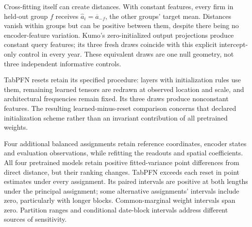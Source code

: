 \documentclass[11pt]{article}
\begin{document}
Cross-fitting itself can create distances. With constant features, every firm
in held-out group $f$ receives $\widehat a_i=\overline a_{-f}$, the
other groups'
target mean. Distances vanish within groups but can be positive between them,
despite there being no encoder-feature variation. Kumo's zero-initialized output
projections produce constant query features; its three fresh draws coincide
with this explicit intercept-only control in every year. These equivalent draws
are one null geometry, not three independent informative controls.

TabPFN resets retain its specified procedure: layers with initialization rules
use them, remaining learned tensors are redrawn at observed location and scale,
and architectural frequencies remain fixed. Its three draws produce nonconstant
features. The resulting learned-minus-reset comparison concerns that declared
initialization scheme rather than an invariant contribution of all pretrained
weights.

\begin{table}[htbp]
  \centering\footnotesize\setlength{\tabcolsep}{4pt}
  
  \caption{Calibrated learned-minus-control forecasts. TabPFN uses
    three specified
    resets; Kumo's three fresh draws reproduce one intercept-only null,
    displayed once. Entries give
    paired joint log-score differences and conditional 95\% intervals at both
  block lengths, under both variance treatments.}
\end{table}
\begin{table}[htbp]
  \centering\small
  
  \caption{Sensitivity to five fixed fold assignments. Ranges summarize
    calibrated-minus-native-direct forecast differences and exposure $R^2$.
  They describe partition sensitivity rather than confidence intervals.}
\end{table}

Four additional balanced assignments retain reference coordinates, encoder
states and evaluation observations, while refitting the readouts and spatial
coefficients. All four pretrained models retain positive fitted-variance point
differences from direct distance, but their ranking changes. TabPFN exceeds each
reset in point estimates under every assignment. Its paired intervals are
positive at both lengths under the principal assignment; some alternative
assignments' intervals include zero, particularly with longer blocks.
Common-marginal weight intervals span zero.
Partition ranges and conditional date-block intervals address different
sources of sensitivity.
\end{document}
